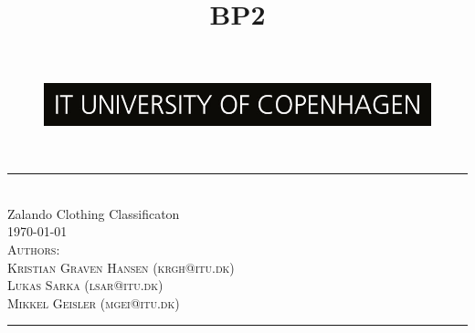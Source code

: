 \title{BP2}
\begin{titlepage}
\centering
\newcommand{\HLine}{\rule{\linewidth}{0.5mm}}

\begin{figure}[h]
\centering
\includegraphics[width=12cm]{figures_for_report/ITU_logo}
\end{figure}
\hfill \break
\hfill \break
\textsc{\Large}\\
\HLine \\[0.5cm]
\huge Zalando Clothing Classificaton \\
\small{\today}\\
\vspace*{.5cm}
\textsc{\large Authors:
\\Kristian Graven Hansen (krgh@itu.dk)
\\Lukas Sarka (lsar@itu.dk)
\\Mikkel Geisler (mgei@itu.dk)}\\[0.5cm]
\HLine

\begin{minipage}{0.45\textwidth}
\begin{flushleft} \large
\end{flushleft}
\end{minipage}
\begin{minipage}{0.5\textwidth}
\begin{flushright} \large
\end{flushright}
\end{minipage}
\vfill
\end{titlepage}
\pagebreak